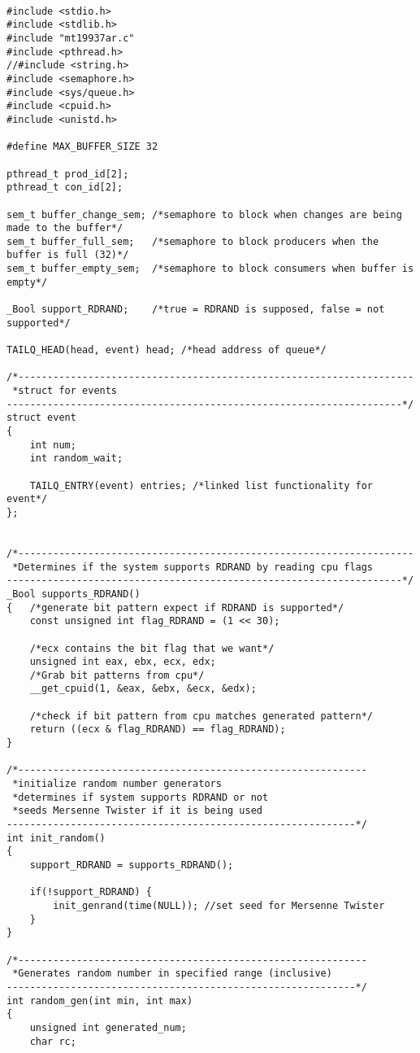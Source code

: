 \documentclass[10pt,onecolumn]{article}
\begin{document}
\begin{lstlisting}

#include <stdio.h>
#include <stdlib.h>
#include "mt19937ar.c"
#include <pthread.h>
//#include <string.h>
#include <semaphore.h>
#include <sys/queue.h>
#include <cpuid.h>
#include <unistd.h>

#define MAX_BUFFER_SIZE 32

pthread_t prod_id[2];
pthread_t con_id[2];

sem_t buffer_change_sem; /*semaphore to block when changes are being made to the buffer*/
sem_t buffer_full_sem;	 /*semaphore to block producers when the buffer is full (32)*/
sem_t buffer_empty_sem;	 /*semaphore to block consumers when buffer is empty*/

_Bool support_RDRAND;	 /*true = RDRAND is supposed, false = not supported*/

TAILQ_HEAD(head, event) head; /*head address of queue*/

/*--------------------------------------------------------------------
 *struct for events
--------------------------------------------------------------------*/
struct event
{
	int num;
	int random_wait;

	TAILQ_ENTRY(event) entries; /*linked list functionality for event*/
};


/*--------------------------------------------------------------------
 *Determines if the system supports RDRAND by reading cpu flags
--------------------------------------------------------------------*/
_Bool supports_RDRAND()
{	/*generate bit pattern expect if RDRAND is supported*/
	const unsigned int flag_RDRAND = (1 << 30); 
						     
	/*ecx contains the bit flag that we want*/
	unsigned int eax, ebx, ecx, edx; 
	/*Grab bit patterns from cpu*/
	__get_cpuid(1, &eax, &ebx, &ecx, &edx); 

	/*check if bit pattern from cpu matches generated pattern*/
	return ((ecx & flag_RDRAND) == flag_RDRAND); 
}

/*------------------------------------------------------------
 *initialize random number generators
 *determines if system supports RDRAND or not
 *seeds Mersenne Twister if it is being used
------------------------------------------------------------*/
int init_random()
{
	support_RDRAND = supports_RDRAND();

	if(!support_RDRAND) {
		init_genrand(time(NULL)); //set seed for Mersenne Twister
	}
}

/*------------------------------------------------------------
 *Generates random number in specified range (inclusive)
------------------------------------------------------------*/
int random_gen(int min, int max)
{
	unsigned int generated_num;
	char rc;


\end{lstlisting}
\end{document}
